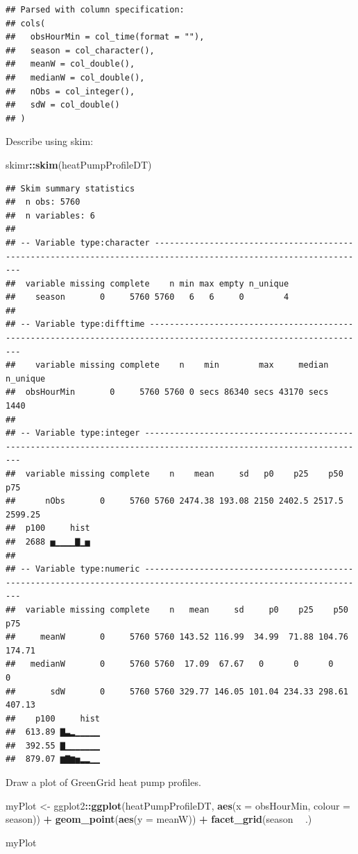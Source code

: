 \documentclass[]{article}
\newenvironment{Shaded}{\begin{snugshade}}{\end{snugshade}}
\newcommand{\KeywordTok}[1]{\textcolor[rgb]{0.13,0.29,0.53}{\textbf{#1}}}
\newcommand{\DataTypeTok}[1]{\textcolor[rgb]{0.13,0.29,0.53}{#1}}
\newcommand{\StringTok}[1]{\textcolor[rgb]{0.31,0.60,0.02}{#1}}
\newcommand{\OperatorTok}[1]{\textcolor[rgb]{0.81,0.36,0.00}{\textbf{#1}}}
\newcommand{\NormalTok}[1]{#1}
\begin{document}
\begin{verbatim}
## Parsed with column specification:
## cols(
##   obsHourMin = col_time(format = ""),
##   season = col_character(),
##   meanW = col_double(),
##   medianW = col_double(),
##   nObs = col_integer(),
##   sdW = col_double()
## )
\end{verbatim}

Describe using skim:

\begin{Shaded}
\begin{Highlighting}[]
\NormalTok{skimr}\OperatorTok{::}\KeywordTok{skim}\NormalTok{(heatPumpProfileDT)}
\end{Highlighting}
\end{Shaded}

\begin{verbatim}
## Skim summary statistics
##  n obs: 5760 
##  n variables: 6 
## 
## -- Variable type:character -----------------------------------------------------------------------------------------------------------------
##  variable missing complete    n min max empty n_unique
##    season       0     5760 5760   6   6     0        4
## 
## -- Variable type:difftime ------------------------------------------------------------------------------------------------------------------
##    variable missing complete    n    min        max     median n_unique
##  obsHourMin       0     5760 5760 0 secs 86340 secs 43170 secs     1440
## 
## -- Variable type:integer -------------------------------------------------------------------------------------------------------------------
##  variable missing complete    n    mean     sd   p0    p25    p50     p75
##      nObs       0     5760 5760 2474.38 193.08 2150 2402.5 2517.5 2599.25
##  p100     hist
##  2688 ▅▁▁▁▁▇▁▅
## 
## -- Variable type:numeric -------------------------------------------------------------------------------------------------------------------
##  variable missing complete    n   mean     sd     p0    p25    p50    p75
##     meanW       0     5760 5760 143.52 116.99  34.99  71.88 104.76 174.71
##   medianW       0     5760 5760  17.09  67.67   0      0      0      0   
##       sdW       0     5760 5760 329.77 146.05 101.04 234.33 298.61 407.13
##    p100     hist
##  613.89 ▇▃▂▁▁▁▁▁
##  392.55 ▇▁▁▁▁▁▁▁
##  879.07 ▆▇▆▅▂▂▁▁
\end{verbatim}

Draw a plot of GreenGrid heat pump profiles.

\begin{Shaded}
\begin{Highlighting}[]
\NormalTok{myPlot <-}\StringTok{ }\NormalTok{ggplot2}\OperatorTok{::}\KeywordTok{ggplot}\NormalTok{(heatPumpProfileDT, }\KeywordTok{aes}\NormalTok{(}\DataTypeTok{x =}\NormalTok{ obsHourMin, }\DataTypeTok{colour =}\NormalTok{ season)) }\OperatorTok{+}
\StringTok{  }\KeywordTok{geom_point}\NormalTok{(}\KeywordTok{aes}\NormalTok{(}\DataTypeTok{y =}\NormalTok{ meanW)) }\OperatorTok{+}
\StringTok{  }\KeywordTok{facet_grid}\NormalTok{(season }\OperatorTok{~}\StringTok{ }\NormalTok{.)}

\NormalTok{myPlot}
\end{Highlighting}
\end{Shaded}
\end{document}
